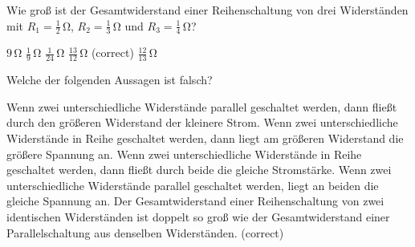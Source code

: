 \documentclass[11pt]{exam}
\begin{document}
\begin{questions}
\vspace{3mm}\question Wie groß ist der Gesamtwiderstand einer Reihenschaltung von drei Widerständen mit \(R_1=\mathrm{\frac{1}{2}\,\Omega}\), \(R_2=\mathrm{\frac{1}{3}\,\Omega}\) und \(R_3=\mathrm{\frac{1}{4}\,\Omega}\)?

\begin{choices}
	\choice \(\mathrm{9\,\Omega}\)
	\choice \(\mathrm{\frac{1}{9}\,\Omega}\)
	\choice \(\mathrm{\frac{1}{24}\,\Omega}\)
	\choice \(\mathrm{\frac{13}{12}\,\Omega}\) (correct)
	\choice \(\mathrm{\frac{12}{13}\,\Omega}\)
\end{choices}

\vspace{3mm}\question Welche der folgenden Aussagen ist falsch?

\begin{choices}
	\choice Wenn zwei unterschiedliche Widerstände parallel geschaltet werden, dann fließt durch den größeren Widerstand der kleinere Strom.
	\choice Wenn zwei unterschiedliche Widerstände in Reihe geschaltet werden, dann liegt am größeren Widerstand die größere Spannung an.
	\choice Wenn zwei unterschiedliche Widerstände in Reihe geschaltet werden, dann fließt durch beide die gleiche Stromstärke.
	\choice Wenn zwei unterschiedliche Widerstände parallel geschaltet werden, liegt an beiden die gleiche Spannung an.
	\choice Der Gesamtwiderstand einer Reihenschaltung von zwei identischen Widerständen ist doppelt so groß wie der Gesamtwiderstand einer Parallelschaltung aus denselben Widerständen. (correct)
\end{choices}

\vspace{3mm}\end{questions}
\end{document}

